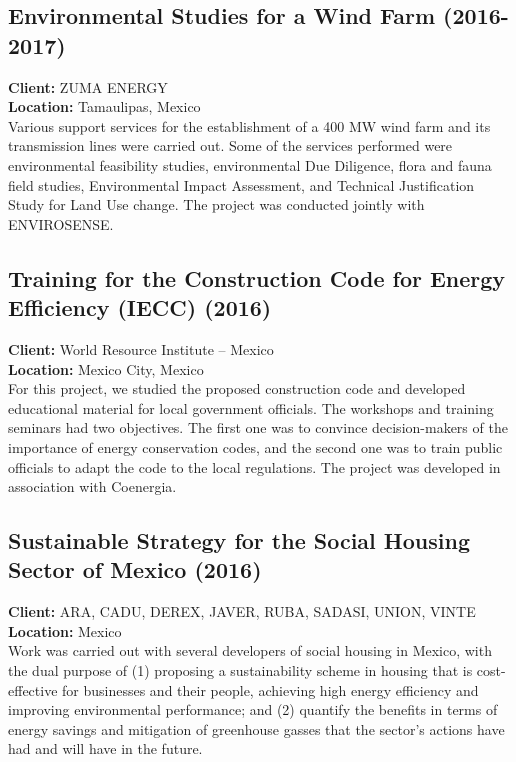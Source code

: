\documentclass[
	a4paper,
	12pt,
	unnumberedsections,
]{CSSullivanBusinessReport}
\begin{document}
\subsection{Environmental Studies for a Wind Farm (2016-2017)}
\textbf{Client:}  ZUMA ENERGY \\
\textbf{Location:}  Tamaulipas, Mexico \\[0.5em]
 Various support services for the establishment of a 400 MW wind farm and its transmission lines were carried out. Some of the services performed were environmental feasibility studies, environmental Due Diligence, flora and fauna field studies, Environmental Impact Assessment, and Technical Justification Study for Land Use change. The project was conducted jointly with ENVIROSENSE.

\subsection{Training for the Construction Code for Energy Efficiency (IECC) (2016)}
\textbf{Client:}  World Resource Institute – Mexico \\
\textbf{Location:}  Mexico City, Mexico	 \\[0.5em]
 For this project, we studied the proposed construction code and developed educational material for local government officials. The workshops and training seminars had two objectives. The first one was to convince decision-makers of the importance of energy conservation codes, and the second one was to train public officials to adapt the code to the local regulations. The project was developed in association with Coenergia.

\subsection{Sustainable Strategy for the Social Housing Sector of Mexico (2016)}
\textbf{Client:}  ARA, CADU, DEREX, JAVER, RUBA, SADASI, UNION, VINTE \\
\textbf{Location:}  Mexico	 \\[0.5em]
 Work was carried out with several developers of social housing in Mexico, with the dual purpose of (1) proposing a sustainability scheme in housing that is cost-effective for businesses and their people, achieving high energy efficiency and improving environmental performance; and (2) quantify the benefits in terms of energy savings and mitigation of greenhouse gasses that the sector’s actions have had and will have in the future.
\end{document}
